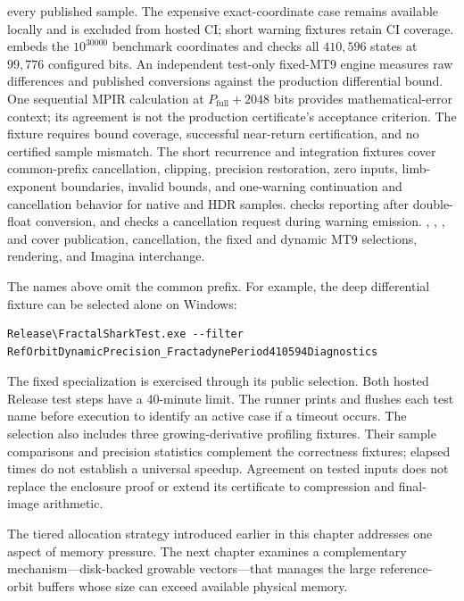 \begin{itemize}
        every published sample. The expensive exact-coordinate case remains
        available locally and is excluded from hosted CI; short warning fixtures
        retain CI coverage.
        embeds the $10^{30000}$ benchmark coordinates and checks all $410{,}596$
        states at $99{,}776$ configured bits. An independent test-only fixed-MT9
        engine measures raw differences and published conversions against the
        production differential bound. One sequential MPIR calculation at
        $P_{\mathrm{full}}+2048$ bits provides mathematical-error context; its
        agreement is not the production certificate's acceptance criterion.
        The fixture requires bound coverage, successful near-return certification,
        and no certified sample mismatch. The short recurrence and integration
        fixtures cover common-prefix cancellation, clipping, precision restoration,
        zero inputs, limb-exponent boundaries, invalid bounds, and one-warning
        continuation and cancellation behavior for native and HDR samples.
         checks reporting after
        double-float conversion, and 
        checks a cancellation request during warning emission.
        ,
        , , and
         cover publication, cancellation,
        the fixed and dynamic MT9 selections, rendering, and Imagina interchange.
\end{itemize}
The names above omit the common  prefix.
For example, the deep differential fixture can be selected alone on Windows:
\begin{lstlisting}[language={}]
Release\FractalSharkTest.exe --filter RefOrbitDynamicPrecision_FractadynePeriod410594Diagnostics
\end{lstlisting}
The fixed specialization is exercised through its public selection. Both hosted
Release test steps have a 40-minute limit. The runner prints and flushes each
test name before execution to identify an active case if a timeout occurs.
The selection also includes three growing-derivative
profiling fixtures.
Their sample comparisons and precision statistics complement the correctness
fixtures; elapsed times do not establish a universal speedup. Agreement on
tested inputs does not replace the enclosure proof or extend its certificate
to compression and final-image arithmetic.

The tiered allocation strategy introduced earlier in this chapter addresses one aspect of memory
pressure.  The next chapter examines a complementary mechanism---disk-backed
growable vectors---that manages the large reference-orbit buffers whose size
can exceed available physical memory.

